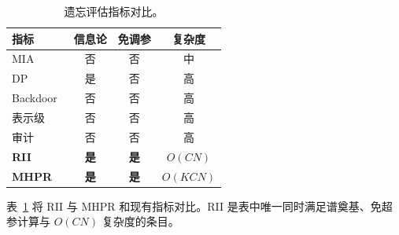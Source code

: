 \begin{table}[t]
\centering
\caption{遗忘评估指标对比。}\label{tab:metric_compare}
\setlength{\tabcolsep}{3pt}
\begin{tabular}{l c c c}
\toprule
指标 & 信息论 & 免调参 & 复杂度 \\
\midrule
MIA~\cite{shokri2017membership} & 否 & 否 & 中 \\
DP~\cite{guo2020certified} & 是 & 否 & 高 \\
Backdoor~\cite{sommer2022towards} & 否 & 否 & 高 \\
表示级~\cite{cosma2026ruler} & 否 & 否 & 高 \\
审计~\cite{ye2026auditing} & 否 & 否 & 高 \\
\textbf{RII} & \textbf{是} & \textbf{是} & $O(CN)$ \\
\textbf{MHPR} & \textbf{是} & \textbf{是} & $O(KCN)$ \\
\bottomrule
\end{tabular}
\end{table}

表~\ref{tab:metric_compare} 将 RII 与 MHPR 和现有指标对比。RII 是表中唯一同时满足谱奠基、免超参计算与 $O(CN)$ 复杂度的条目。
